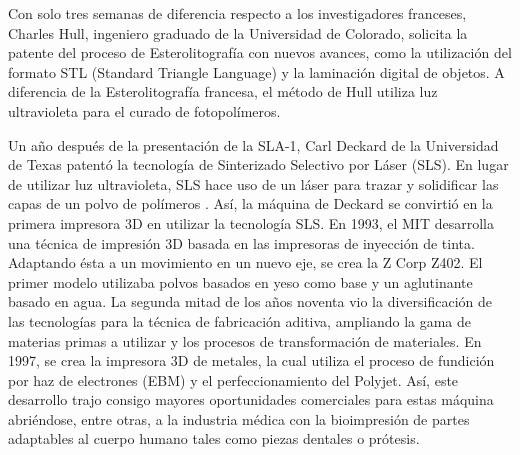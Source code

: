 Con solo tres semanas de diferencia respecto a los investigadores franceses, Charles Hull, ingeniero graduado de la Universidad de Colorado, solicita la patente del proceso de Esterolitografía con nuevos avances, como la utilización del formato STL (Standard Triangle Language) y la laminación digital de objetos. A diferencia de la Esterolitografía francesa, el método de Hull utiliza luz ultravioleta para el curado de fotopolímeros. 

Un año después de la presentación de la SLA-1, Carl Deckard de la Universidad de Texas patentó la tecnología de Sinterizado Selectivo por Láser (SLS). En lugar de utilizar luz ultravioleta, SLS hace uso de un láser para trazar y solidificar las capas de un polvo de polímeros \parencite{tresdsourced2020}. Así, la máquina de Deckard se convirtió en la primera impresora 3D en utilizar la tecnología SLS.
En 1993, el MIT desarrolla una técnica de impresión 3D basada en las impresoras de inyección de tinta. Adaptando ésta a un movimiento en un nuevo eje, se crea la Z Corp Z402. El primer modelo utilizaba polvos basados en yeso como base y un aglutinante basado en agua. 
La segunda mitad de los años noventa vio la diversificación de las tecnologías para la técnica de fabricación aditiva, ampliando la gama de materias primas a utilizar y los procesos de transformación de materiales. En 1997, se crea la impresora 3D de metales, la cual utiliza el proceso de fundición por haz de electrones (EBM) y el perfeccionamiento del Polyjet. Así, este desarrollo trajo consigo mayores oportunidades comerciales para estas máquina abriéndose, entre otras, a la industria médica con la bioimpresión de partes adaptables al cuerpo humano tales como piezas dentales o prótesis\parencite{tresdsourced2020}.
